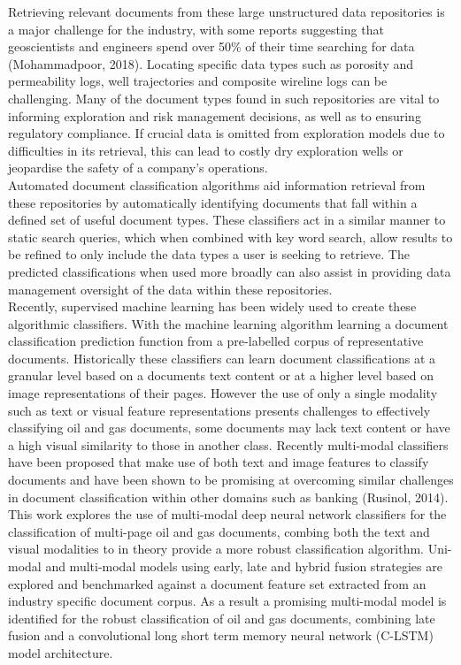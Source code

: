 \documentclass[a4paper,12pt]{article}
\begin{document}
Retrieving relevant documents from these large unstructured data repositories is a major challenge for the industry, with some reports suggesting that geoscientists and engineers spend over 50\% of their time searching for data (Mohammadpoor, 2018). Locating specific data types such as porosity and permeability logs, well trajectories and composite wireline logs can be challenging. Many of the document types found in such repositories are vital to informing exploration and risk management decisions, as well as to ensuring regulatory compliance. If crucial data is omitted from exploration models due to difficulties in its retrieval, this can lead to costly dry exploration wells or jeopardise the safety of a company’s operations.\\

Automated document classification algorithms aid information retrieval from these repositories by automatically identifying documents that fall within a defined set of useful document types. These classifiers act in a similar manner to static search queries, which when combined with key word search, allow results to be refined to only include the data types a user is seeking to retrieve. The predicted classifications when used more broadly can also assist in providing data management oversight of the data within these repositories. \\

Recently, supervised machine learning has been widely used to create these algorithmic classifiers. With the machine learning algorithm learning a document classification prediction function from a pre-labelled corpus of representative documents. Historically these classifiers can learn document classifications at a granular level based on a documents text content or at a higher level based on image representations of their pages. However the use of only a single modality such as text or visual feature representations presents challenges to effectively classifying oil and gas documents, some documents may lack text content or have a high visual similarity to those in another class. Recently multi-modal classifiers have been proposed that make use of both text and image features to classify documents and have been shown to be promising at overcoming similar challenges in document classification within other domains such as banking (Rusinol, 2014).  \\

This work explores the use of multi-modal deep neural network classifiers for the classification of multi-page oil and gas documents, combing both the text and visual modalities to in theory provide a more robust classification algorithm. Uni-modal and multi-modal models using early, late and hybrid fusion strategies are explored and benchmarked against a document feature set extracted from an industry specific document corpus. As a result a promising multi-modal model is identified for the robust classification of oil and gas documents, combining late fusion and a convolutional long short term memory neural network (C-LSTM) model architecture.\\
\end{document}
